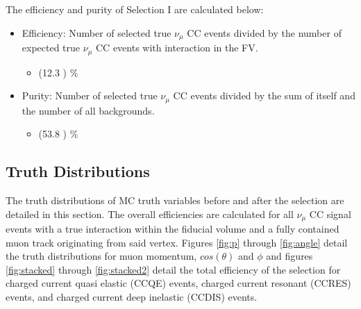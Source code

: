 The efficiency and purity of Selection I are calculated below:
\begin{itemize}
\item Efficiency: Number of selected true $\nu_{\mu}$ CC events divided by the number of expected true $\nu_{\mu}$ CC events with interaction in the FV.
	\begin{itemize}
	\item (12.3 ) \%
	\end{itemize}
\item Purity: Number of selected true $\nu_{\mu}$ CC events divided by the sum of itself and the number of all backgrounds.
	\begin{itemize}
	\item (53.8 ) \%
	\end{itemize}
\end{itemize}
\subsection{Truth Distributions}
The truth distributions of MC truth variables before and after the selection are detailed in this section. The overall efficiencies are calculated for all $\nu_{\mu}$ CC signal events with a true interaction within the fiducial volume and a fully contained muon track originating from said vertex. Figures \ref{fig:p} through \ref{fig:angle} detail the truth distributions for muon momentum, $cos(\theta)$ and $\phi$ and figures \ref{fig:stacked} through \ref{fig:stacked2} detail the total efficiency of the selection for charged current quasi elastic (CCQE) events, charged current resonant (CCRES) events, and charged current deep inelastic (CCDIS) events. 

